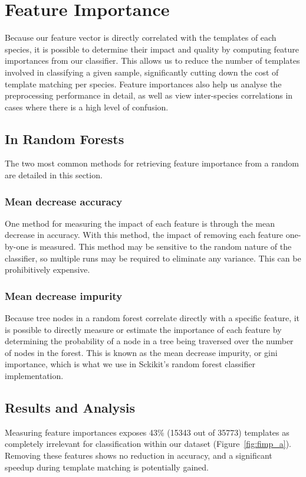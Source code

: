 \section{Feature Importance}\label{sec:feature_imp}
Because our feature vector is directly correlated with the templates of each species,
it is possible to determine their impact and quality by computing feature
importances from our classifier.
This allows us to reduce the number of templates involved in classifying a given
sample, significantly cutting down the cost of template matching per species.
Feature importances also help us analyse the preprocessing performance in detail,
as well as view inter-species correlations in cases where there is a high
level of confusion.

\subsection{In Random Forests}

The two most common methods for retrieving feature importance from a random
are detailed in this section.

\subsubsection{Mean decrease accuracy}
One method for measuring the impact of each feature is through the mean decrease
in accuracy.
With this method, the impact of removing each feature one-by-one is measured.
This method may be sensitive to the random nature of the classifier, so multiple
runs may be required to eliminate any variance.
This can be prohibitively expensive.

\subsubsection{Mean decrease impurity}
Because tree nodes in a random forest correlate directly with a specific
feature, it is possible to directly measure or estimate the importance of each
feature by determining the probability of a node in a tree being traversed over 
the number of nodes in the forest.
This is known as the mean decrease impurity, or gini importance, which is what
we use in Sckikit's random forest classifier implementation.

\subsection{Results and Analysis}\label{sec:template_analysis}
Measuring feature importances exposes 43\% (15343 out of 35773) templates as 
completely irrelevant for classification within our dataset
(Figure~\ref{fig:fimp_a}).
Removing these features shows no reduction in accuracy, and a significant speedup
during template matching is potentially gained.

